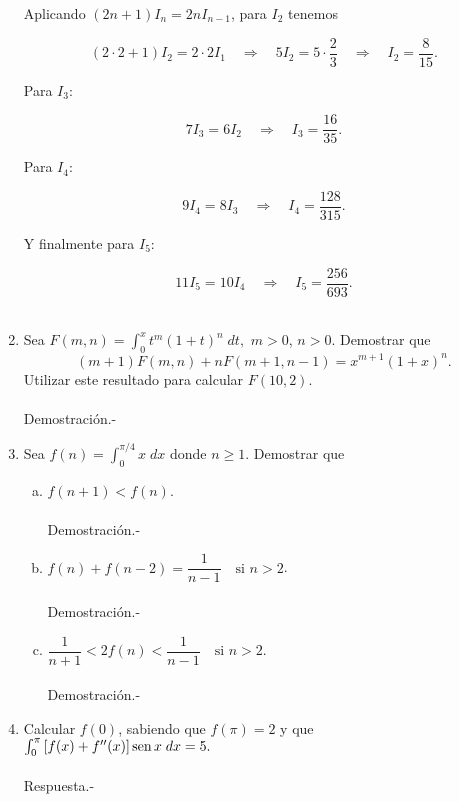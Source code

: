 \begin{enumerate}[\bfseries 1.]
	Aplicando $(2n+1)I_n = 2nI_{n-1}$, para $I_2$ tenemos

	$$(2\cdot 2+1)I_2 = 2\cdot 2I_1 \quad \Rightarrow \quad 5I_2=5\cdot \dfrac{2}{3}\quad \Rightarrow \quad I_2=\dfrac{8}{15}.$$

	Para $I_3$:

	$$7I_3=6I_2\quad \Rightarrow \quad I_3=\dfrac{16}{35}.$$

	Para $I_4$:

	$$9I_4=8I_3\quad \Rightarrow \quad I_4=\dfrac{128}{315}.$$

	Y finalmente para $I_5$:

	$$11I_5=10I_4\quad \Rightarrow \quad I_5=\dfrac{256}{693}.$$\\


    \item Sea $F(m,n)=\displaystyle\int_0^x t^m(1+t)^n \; dt,$ $m>0$, $n>0$. Demostrar que
    $$(m+1)F(m,n)+nF(m+1,n-1)=x^{m+1}(1+x)^n.$$
    Utilizar este resultado para calcular $F(10,2)$.\\\\
	Demostración.-\;

    \item Sea $f(n)=\displaystyle\int_0^{\pi/4}x\; dx$ donde $n\geq 1$. Demostrar que

    \begin{enumerate}[(a)]

	\item $f(n+1)<f(n)$.\\\\
	    Demostración.-\;

	\item $f(n)+f(n-2)=\dfrac{1}{n-1}\quad \mbox{si } n>2$.\\\\
	    Demostración.-\;

	\item $\dfrac{1}{n+1}<2f(n)<\dfrac{1}{n-1}\quad \mbox{si } n>2$.\\\\
	    Demostración.-\;

    \end{enumerate}

    \item Calcular $f(0)$, sabiendo que $f(\pi)=2$ y que $\int_0^\pi \left[f(x)+f''(x)\right]\mathop{\mbox{\normalfont sen}}\nolimits x\; dx = 5.$\\\\
	Respuesta.-\;


\end{enumerate}
